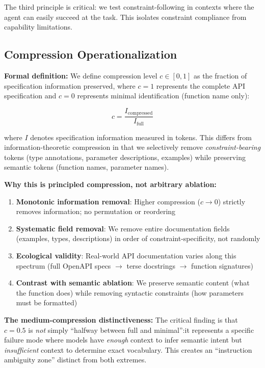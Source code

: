 \documentclass[11pt]{article}
\begin{document}
The third principle is critical: we test constraint-following in contexts where the agent can easily succeed at the task. This isolates constraint compliance from capability limitations.

\subsection{Compression Operationalization}

\textbf{Formal definition:} We define compression level $c \in [0, 1]$ as the fraction of specification information preserved, where $c=1$ represents the complete API specification and $c=0$ represents minimal identification (function name only):

\begin{equation}
c = \frac{I_{\text{compressed}}}{I_{\text{full}}}
\end{equation}

where $I$ denotes specification information measured in tokens. This differs from information-theoretic compression in that we selectively remove \emph{constraint-bearing} tokens (type annotations, parameter descriptions, examples) while preserving semantic tokens (function names, parameter names).

\textbf{Why this is principled compression, not arbitrary ablation:}

\begin{enumerate}
\item \textbf{Monotonic information removal}: Higher compression ($c \rightarrow 0$) strictly removes information; no permutation or reordering
\item \textbf{Systematic field removal}: We remove entire documentation fields (examples, types, descriptions) in order of constraint-specificity, not randomly
\item \textbf{Ecological validity}: Real-world API documentation varies along this spectrum (full OpenAPI specs $\rightarrow$ terse docstrings $\rightarrow$ function signatures)
\item \textbf{Contrast with semantic ablation}: We preserve semantic content (what the function does) while removing syntactic constraints (how parameters must be formatted)
\end{enumerate}

\textbf{The medium-compression distinctiveness:} The critical finding is that $c=0.5$ is \emph{not} simply ``halfway between full and minimal'':it represents a specific failure mode where models have \emph{enough} context to infer semantic intent but \emph{insufficient} context to determine exact vocabulary. This creates an ``instruction ambiguity zone'' distinct from both extremes.
\end{document}
